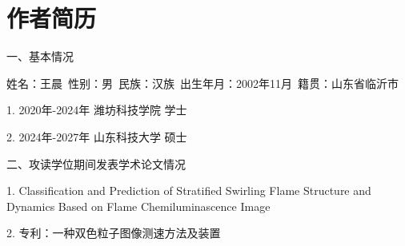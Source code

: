 


\chapter*{作者简历}

一、基本情况

姓名：王晨\ 性别：男\ 民族：汉族\ 出生年月：2002年11月\ 籍贯：山东省临沂市

1. 2020年-2024年 潍坊科技学院 学士

2. 2024年-2027年 山东科技大学 硕士

二、攻读学位期间发表学术论文情况

1. Classification and Prediction of Stratified Swirling Flame Structure and Dynamics Based on Flame Chemiluminascence Image

2. 专利：一种双色粒子图像测速方法及装置

